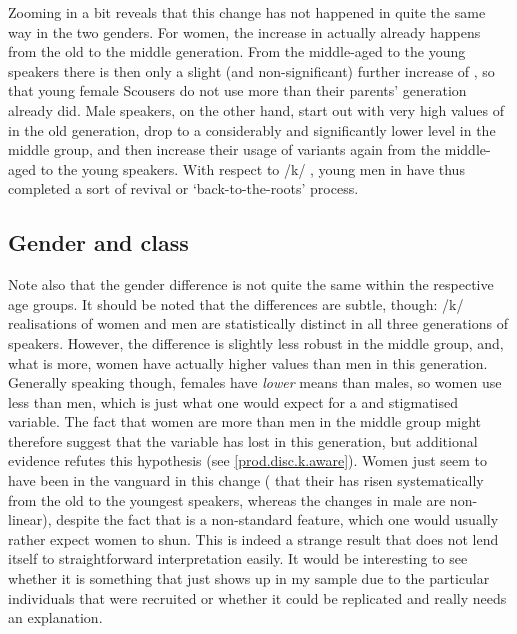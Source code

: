 Zooming in a bit reveals that this change has not happened in quite the same way in the two genders.
For women, the increase in  actually already happens from the old to the middle generation.
From the middle-aged to the young speakers there is then only a slight (and non-significant) further increase of , so that young female Scousers do not use  more than their parents' generation already did.
Male speakers, on the other hand, start out with very high values of  in the old generation, drop to a considerably and significantly lower level in the middle group, and then increase their usage of  variants again from the middle-aged to the young speakers.
With respect to /k/ , young men in  have thus completed a sort of revival or `back-to-the-roots' process.

\subsection{Gender and class}
\label{prod.disc.k.social}

Note also that the gender difference is not quite the same within the respective age groups.
It should be noted that the differences are subtle, though: /k/ realisations of women and men are statistically distinct in all three generations of speakers.
However, the difference is slightly less robust in the middle group, and, what is more, women have actually higher  values than men in this generation.
Generally speaking though, females have \emph{lower}  means than males, so women use less  than men, which is just what one would expect for a  and stigmatised variable.
The fact that women are more  than men in the middle group might therefore suggest that the variable has lost  in this generation, but additional evidence refutes this hypothesis (see \ref{prod.disc.k.aware}).
Women just seem to have been in the vanguard in this change ( that their  has risen systematically from the old to the youngest speakers, whereas the changes in male  are non-linear), despite the fact that  is a  non-standard feature, which one would usually rather expect women to shun.
This is indeed a strange result that does not lend itself to straightforward interpretation easily.
It would be interesting to see whether it is something that just shows up in my sample due to the particular individuals that were recruited or whether it could be replicated and really needs an explanation.

